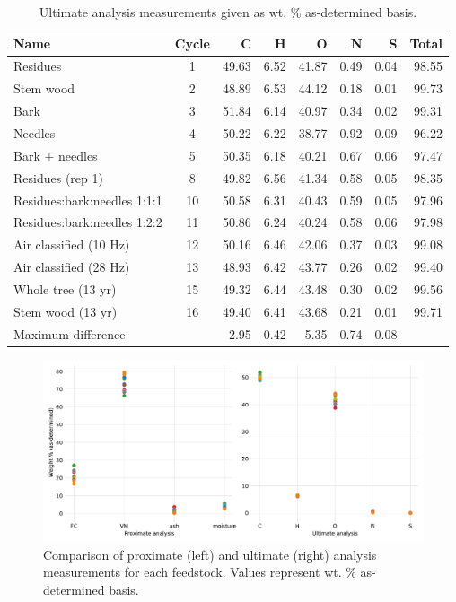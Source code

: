 \begin{table}[H]
    \caption{Ultimate analysis measurements given as wt. \% as-determined basis.}
    \label{tab:ultimate}
    \centering
    \begin{tabular}{lcrrrrrr}
        \toprule
        Name & Cycle & C & H & O & N & S & Total \\
        \midrule
        Residues                    & 1  & 49.63 & 6.52 & 41.87 & 0.49 & 0.04 & 98.55 \\
        Stem wood                   & 2  & 48.89 & 6.53 & 44.12 & 0.18 & 0.01 & 99.73 \\
        Bark                        & 3  & 51.84 & 6.14 & 40.97 & 0.34 & 0.02 & 99.31 \\
        Needles                     & 4  & 50.22 & 6.22 & 38.77 & 0.92 & 0.09 & 96.22 \\
        Bark + needles              & 5  & 50.35 & 6.18 & 40.21 & 0.67 & 0.06 & 97.47 \\
        Residues (rep 1)            & 8  & 49.82 & 6.56 & 41.34 & 0.58 & 0.05 & 98.35 \\
        Residues:bark:needles 1:1:1 & 10 & 50.58 & 6.31 & 40.43 & 0.59 & 0.05 & 97.96 \\
        Residues:bark:needles 1:2:2 & 11 & 50.86 & 6.24 & 40.24 & 0.58 & 0.06 & 97.98 \\
        Air classified (10 Hz)      & 12 & 50.16 & 6.46 & 42.06 & 0.37 & 0.03 & 99.08 \\
        Air classified (28 Hz)      & 13 & 48.93 & 6.42 & 43.77 & 0.26 & 0.02 & 99.40 \\
        Whole tree (13 yr)          & 15 & 49.32 & 6.44 & 43.48 & 0.30 & 0.02 & 99.56 \\
        Stem wood (13 yr)           & 16 & 49.40 & 6.41 & 43.68 & 0.21 & 0.01 & 99.71 \\
        \cmidrule{3-7}
        \multicolumn{2}{l}{Maximum difference} & 2.95 & 0.42 & 5.35 & 0.74 & 0.08 & \\
        \bottomrule
    \end{tabular}
\end{table}

\begin{figure}[H]
    \centering
    \includegraphics[width=\textwidth]{figures/prox-ult-analysis.pdf}
    \caption{Comparison of proximate (left) and ultimate (right) analysis measurements for each feedstock. Values represent wt. \% as-determined basis.}
    \label{fig:prox-ult-analysis}
\end{figure}

